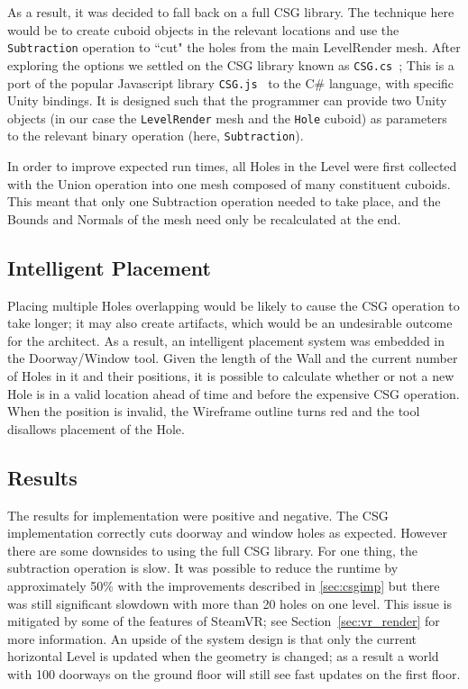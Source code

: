 As a result, it was decided to fall back on a full CSG library. The technique here would be to create cuboid objects in the relevant locations and use the \verb|Subtraction| operation to ``cut" the holes from the main LevelRender mesh. After exploring the options we settled on the CSG library known as \verb|CSG.cs|~\cite{csgcs}; This is a port of the popular Javascript library \verb|CSG.js|~\cite{csgjs} to the C\# language, with specific Unity bindings. It is designed such that the programmer can provide two Unity objects (in our case the \verb|LevelRender| mesh and the \verb|Hole| cuboid) as parameters to the relevant binary operation (here, \verb|Subtraction|).

In order to improve expected run times, all Holes in the Level were first collected with the Union operation into one mesh composed of many constituent cuboids. This meant that only one Subtraction operation needed to take place, and the Bounds and Normals of the mesh need only be recalculated at the end. 

\subsection{Intelligent Placement}

Placing multiple Holes overlapping would be likely to cause the CSG operation to take longer; it may also create artifacts, which would be an undesirable outcome for the architect. As a result, an intelligent placement system was embedded in the Doorway/Window tool. Given the length of the Wall and the current number of Holes in it and their positions, it is possible to calculate whether or not a new Hole is in a valid location ahead of time and before the expensive CSG operation. When the position is invalid, the Wireframe outline turns red and the tool disallows placement of the Hole.

\subsection{Results}

The results for implementation were positive and negative. The CSG implementation correctly cuts doorway and window holes as expected. However there are some downsides to using the full CSG library. For one thing, the subtraction operation is slow. It was possible to reduce the runtime by approximately 50\% with the improvements described in \ref{sec:csgimp} but there was still significant slowdown with more than 20 holes on one level. This issue is mitigated by some of the features of SteamVR; see Section~\ref{sec:vr_render} for more information. An upside of the system design is that only the current horizontal Level is updated when the geometry is changed; as a result a world with 100 doorways on the ground floor will still see fast updates on the first floor.

